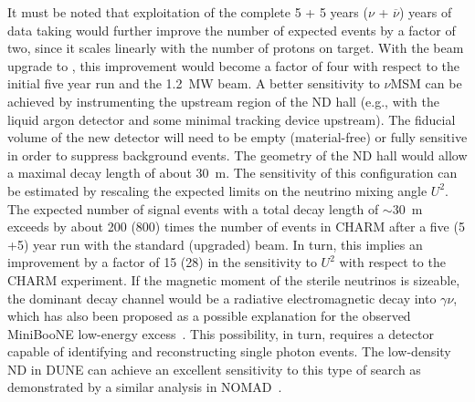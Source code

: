 %
It must be noted that exploitation of the complete 5 + 5 years ($\nu$ + $\overline\nu$) years 
of data taking would further improve the number of expected
events by a factor of  two, since it %
scales linearly with the number of protons on target.  With the beam
upgrade to , this improvement would become a factor of
four with respect to the initial five year run and the %
\SI{1.2}{MW} beam.
A better sensitivity to $\nu$MSM can be achieved by instrumenting the
upstream region of the ND hall (e.g., with the liquid argon detector and some
minimal tracking device upstream). The fiducial volume of the new
detector will need to be empty (material-free) or fully sensitive in order
to suppress background events. The geometry of the ND hall would allow
a maximal decay length of about \SI{30}{m}. The sensitivity of this
configuration can be estimated by rescaling the expected limits on
the neutrino mixing angle $U^2$. The expected number of signal events with a total decay
length of $\sim30$~m exceeds by about 200 (800) times the number of
events in CHARM after a five (5 +5) year run with the standard (upgraded)
beam. In turn, this implies an improvement by a factor of 15 (28) in
the sensitivity to $U^2$ with respect to the CHARM experiment.
If the magnetic moment of the sterile neutrinos
is sizeable, the dominant decay channel would be a radiative
electromagnetic decay into $\gamma \nu$, which has also been proposed
as a possible explanation for the observed MiniBooNE low-energy
excess~\cite{AguilarArevalo:2008rc}. This possibility,  in turn, requires a detector
capable of identifying and reconstructing single photon events.  The
low-density ND in DUNE can achieve an excellent 
sensitivity to this type of search as demonstrated by a similar analysis in
NOMAD~\cite{Kullenberg:2011rd}.
